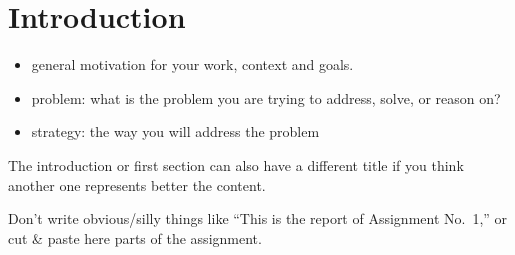 \section{Introduction}
\label{sec:introduction}

\begin{itemize}
\item general motivation for your work, context and goals.
\item problem: what is the problem you are trying to address, solve, or reason on?
\item strategy: the way you will address the problem
\end{itemize}

The introduction or first section can also have a different title if you think another one represents better the content. 

Don't write obvious/silly things like ``This is the report of Assignment No.\ 1,'' or cut \& paste here parts of the assignment. 
